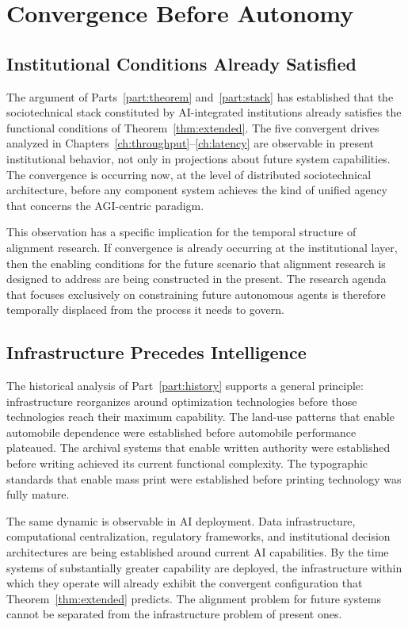 \documentclass[12pt, oneside]{book}
\theoremstyle{plain}
\theoremstyle{definition}
\theoremstyle{remark}
\theoremstyle{definition}
\begin{document}
\chapter{Convergence Before Autonomy}
\label{ch:beforeautonomy}

\section{Institutional Conditions Already Satisfied}

The argument of Parts~\ref{part:theorem} and~\ref{part:stack} has established that
the sociotechnical stack constituted by AI-integrated institutions already satisfies
the functional conditions of Theorem~\ref{thm:extended}. The five convergent drives
analyzed in Chapters~\ref{ch:throughput}--\ref{ch:latency} are observable in present
institutional behavior, not only in projections about future system capabilities.
The convergence is occurring now, at the level of distributed sociotechnical
architecture, before any component system achieves the kind of unified agency that
concerns the AGI-centric paradigm.

This observation has a specific implication for the temporal structure of alignment
research. If convergence is already occurring at the institutional layer, then the
enabling conditions for the future scenario that alignment research is designed to
address are being constructed in the present. The research agenda that focuses
exclusively on constraining future autonomous agents is therefore temporally displaced
from the process it needs to govern.

\section{Infrastructure Precedes Intelligence}

The historical analysis of Part~\ref{part:history} supports a general principle:
infrastructure reorganizes around optimization technologies before those technologies
reach their maximum capability. The land-use patterns that enable automobile
dependence were established before automobile performance plateaued. The archival
systems that enable written authority were established before writing achieved its
current functional complexity. The typographic standards that enable mass print were
established before printing technology was fully mature.

The same dynamic is observable in AI deployment. Data infrastructure, computational
centralization, regulatory frameworks, and institutional decision architectures are
being established around current AI capabilities. By the time systems of substantially
greater capability are deployed, the infrastructure within which they operate will
already exhibit the convergent configuration that Theorem~\ref{thm:extended} predicts.
The alignment problem for future systems cannot be separated from the infrastructure
problem of present ones.
\end{document}
